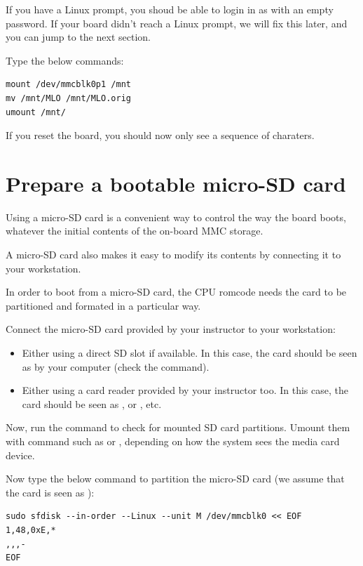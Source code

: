 If you have a Linux prompt, you shoud be able to login in as 
with an empty password. If your board didn't reach a Linux prompt, we
will fix this later, and you can jump to the next section. 

Type the below commands:

\begin{verbatim}
mount /dev/mmcblk0p1 /mnt
mv /mnt/MLO /mnt/MLO.orig
umount /mnt/
\end{verbatim}

If you reset the board, you should now only see a sequence of 
charaters.

\section{Prepare a bootable micro-SD card}

Using a micro-SD card is a convenient way to control the way
the board boots, whatever the initial contents of the on-board MMC
storage.

A micro-SD card also makes it easy to modify its contents by connecting
it to your workstation.

In order to boot from a micro-SD card, the CPU romcode needs the card
to be partitioned and formated in a particular way.

Connect the micro-SD card provided by your instructor to your
workstation:

\begin{itemize}
\item Either using a direct SD slot if available.
      In this case, the card should be seen as  by
      your computer (check the  command).
\item Either using a card reader provided by your instructor too.
      In this case, the card should be seen as , or
      , etc.
\end{itemize}

Now, run the  command to check for mounted SD card
partitions. Umount them with command such as  or , depending on how
the system sees the media card device.

Now type the below command to partition the micro-SD card
(we assume that the card is seen as ):

\begin{verbatim}
sudo sfdisk --in-order --Linux --unit M /dev/mmcblk0 << EOF
1,48,0xE,*
,,,-
EOF
\end{verbatim}


